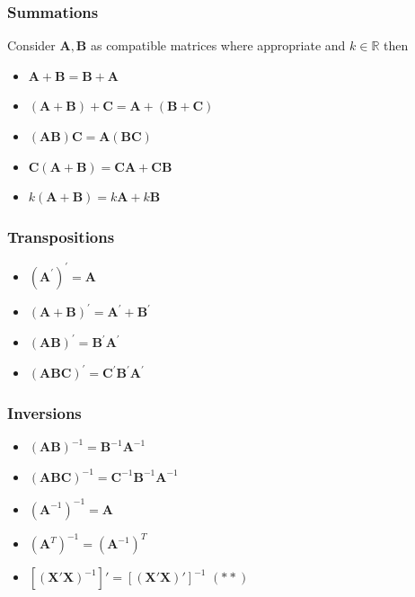 \documentclass[10pt]{article}
\newcommand{\real}{\mathbb{R}}
\begin{document}
\subsubsection{Summations}
Consider $\mathbf{A}, \mathbf{B}$ as compatible matrices where appropriate and $k \in \real$ then
\begin{itemize}
    \item $\mathbf{A}+\mathbf{B}=\mathbf{B}+\mathbf{A}$
    \item $(\mathbf{A}+\mathbf{B})+\mathbf{C}=\mathbf{A}+(\mathbf{B}+\mathbf{C})$
    \item $(\mathbf{A B}) \mathbf{C}=\mathbf{A}(\mathbf{B C})$
    \item $\mathbf{C}(\mathbf{A}+\mathbf{B})=\mathbf{C} \mathbf{A}+\mathbf{C B}$
    \item $k(\mathbf{A}+\mathbf{B})=k \mathbf{A}+k \mathbf{B}$
\end{itemize}
\subsubsection{Transpositions}
\begin{itemize}
    \item $\left(\mathbf{A}^{\prime}\right)^{\prime}=\mathbf{A}$
    \item $(\mathbf{A}+\mathbf{B})^{\prime}=\mathbf{A}^{\prime}+\mathbf{B}^{\prime}$
    \item $(\mathbf{A B})^{\prime}=\mathbf{B}^{\prime} \mathbf{A}^{\prime}$
    \item $(\mathbf{A B C})^{\prime}=\mathbf{C}^{\prime} \mathbf{B}^{\prime} \mathbf{A}^{\prime}$
\end{itemize}
\subsubsection{Inversions}
\begin{itemize}
    \item $(\mathbf{A B})^{-1}=\mathbf{B}^{-1} \mathbf{A}^{-1}$
    \item $(\mathbf{A B C})^{-1}=\mathbf{C}^{-1} \mathbf{B}^{-1} \mathbf{A}^{-1}$
    \item $\left(\mathbf{A}^{-1}\right)^{-1}=\mathbf{A}$
    \item $\left(\mathbf{A}^{T}\right)^{-1}=\left(\mathbf{A}^{-1}\right)^{T}$ 
    \item \color{BurntOrange}$[(\mathbf{X}'\mathbf{X})^{-1}]' = [(\mathbf{X}'\mathbf{X})']^{-1}$ \hfill $(**)$\color{Black}
\end{itemize}
\end{document}
